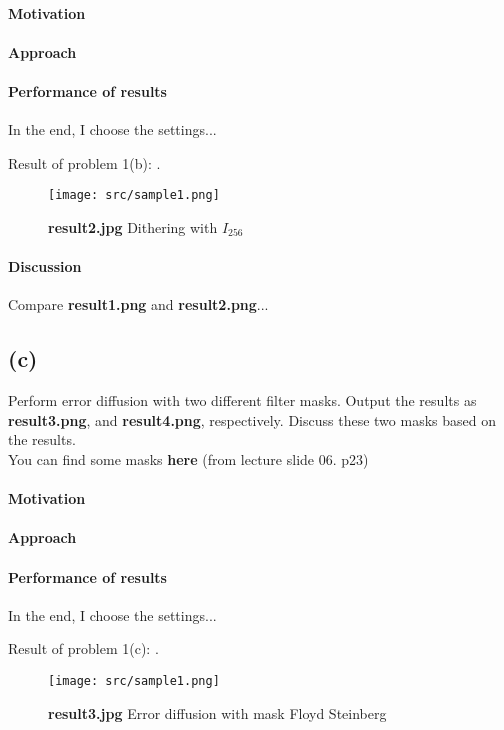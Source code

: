 \paragraph{Motivation}

\paragraph{Approach}

\paragraph{Performance of results}
In the end, I choose the \alert{settings}...

Result of problem 1(b): .
\begin{figure}
    \centering
    \texttt{[image: src/sample1.png]}
    \caption{\textbf{result2.jpg} Dithering with \(I_{256}\)}
    \label{result2}
\end{figure}

\paragraph{Discussion}
Compare \textbf{result1.png} and \textbf{result2.png}...

\subsection{(c)}\label{1_c}
Perform error diffusion with two different filter masks. Output the results as \textbf{result3.png}, and \textbf{result4.png}, respectively. Discuss these two masks based on the results. \\
You can find some masks \textbf{here} (from lecture slide 06. p23)

\paragraph{Motivation}

\paragraph{Approach}

\paragraph{Performance of results}
In the end, I choose the \alert{settings}...

Result of problem 1(c): .
\begin{figure}
    \centering
    \texttt{[image: src/sample1.png]}
    \caption{\textbf{result3.jpg} Error diffusion with mask Floyd Steinberg}
    \label{result3}
\end{figure}

